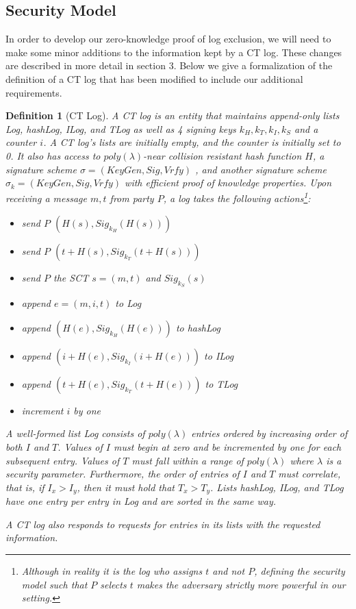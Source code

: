 \documentclass[letterpaper,twocolumn,10pt]{article}
\newtheorem{definition}[theorem]{Definition}
\begin{document}
\subsection{Security Model}
In order to develop our zero-knowledge proof of log exclusion, we will need to make some minor additions to the information kept by a CT log. These changes are described in more detail in section 3. Below we give a formalization of the definition of a CT log that has been modified to include our additional requirements. 
\begin{definition}[CT Log]
A CT log is an entity that maintains append-only lists Log, hashLog, ILog, and TLog as well as 4 signing keys $k_H, k_T, k_I, k_S$ and a counter $i$. A CT log's lists are initially empty, and the counter is initially set to 0. It also has access to $poly(\lambda)$-near collision resistant hash function $H$, a signature scheme $\sigma=(KeyGen, Sig, Vrfy)$ , and another signature scheme $\sigma_k = (KeyGen, Sig, Vrfy)$ with efficient proof of knowledge properties. Upon receiving a message $m, t$ from party $P$, a log takes the following actions\footnote{Although in reality it is the log who assigns $t$ and not $P$, defining the security model such that $P$ selects $t$ makes the adversary strictly more powerful in our setting.}:
\begin{itemize}
\item send $P$ $(H(s), Sig_{k_H}(H(s)))$
\item send $P$ $(t+H(s), Sig_{k_T}(t+H(s)))$
\item send $P$ the SCT $s=(m, t)$ and $Sig_{k_S}(s)$
\item append $e = (m, i, t)$ to Log
\item append $(H(e), Sig_{k_H}(H(e)))$ to hashLog
\item append $(i+H(e), Sig_{k_I}(i+H(e)))$ to ILog
\item append $(t+H(e), Sig_{k_T}(t+H(e)))$ to TLog
\item increment $i$ by one
\end{itemize}

A well-formed list Log consists of $poly(\lambda)$ entries ordered by increasing order of both $I$ and $T$. Values of $I$ must begin at zero and be incremented by one for each subsequent entry. Values of $T$ must fall within a range of $poly(\lambda)$ where $\lambda$ is a security parameter. Furthermore, the order of entries of $I$ and $T$ must correlate, that is, if $I_x>I_y$, then it must hold that $T_x>T_y$. Lists hashLog, ILog, and TLog have one entry per entry in Log and are sorted in the same way.

A CT log also responds to requests for entries in its lists with the requested information.
\end{definition}
\end{document}
